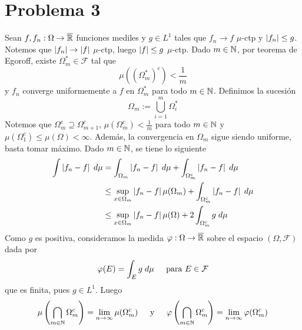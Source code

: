 \documentclass{article}
\begin{document}
\section*{Problema 3}
\noindent Sean $f,f_{n}:\Omega\to\overline{\mathbb{R}}$ funciones mediles y $g\in L^{1}$ tales que $f_{n}\to f$ 
$\mu$-ctp y $\left|f_{n} \right|\leq g$. Notemos que $\left|f_{n} \right|\to\left|f \right|$ $\mu$-ctp, luego 
$\left|f \right|\leq g$ $\mu$-ctp. Dado $m\in\mathbb{N}$, por teorema de Egoroff, existe $\Omega_{m}^{*}\in
\mathcal{F}$ tal que
\begin{equation*}
    \mu((\Omega_{m}^{*})^{c})<\frac{1}{m}
\end{equation*}
y $f_{n}$ converge uniformemente a $f$ en $\Omega_{m}^{*}$ para todo $m\in\mathbb{N}$. 
Definimos la sucesión
\begin{equation*}
    \Omega_{m}:=\bigcup_{i=1}^{m}\Omega_{i}^{*}
\end{equation*}
Notemos que $\Omega_{m}^{c}\supseteq\Omega_{m+1}^{c}$, $\mu(\Omega_{m}^{c})<\frac{1}{m}$ para todo 
$m\in\mathbb{N}$ y $\mu(\Omega_{1}^{c})\leq\mu(\Omega)<\infty$. Además, la convergencia en $\Omega_{m}$ 
sigue siendo uniforme, basta tomar máximo. Dado $m\in\mathbb{N}$, se tiene lo siguiente
\begin{align*}
    \int\left|f_{n}-f \right|\hspace{1mm}d\mu &= \int_{\Omega_{m}}\left|f_{n}-f \right|\hspace{1mm}d\mu+
    \int_{\Omega_{m}^{c}}\left|f_{n}-f \right|\hspace{1mm}d\mu \\
    &\leq \sup_{x\in\Omega_{m}}\left|f_{n}-f \right|\mu(\Omega_{m})
    +\int_{\Omega_{m}^{c}}\left|f_{n}-f \right|\hspace{1mm}d\mu \\
    &\leq \sup_{x\in\Omega_{m}}\left|f_{n}-f \right|\mu(\Omega)
    +2\int_{\Omega_{m}^{c}}g\hspace{1mm}d\mu
\end{align*}
Como $g$ es positiva, consideramos la medida $\varphi:\Omega\to\overline{\mathbb{R}}$ sobre el espacio 
$(\Omega, \mathcal{F})$ dada por
\begin{equation*}
    \varphi(E)=\int_{E}g\hspace{1mm}d\mu\hspace{4mm}\text{ para }E\in\mathcal{F}
\end{equation*}
que es finita, pues $g\in L^{1}$. Luego
\begin{equation*}
    \mu\left(\bigcap_{m\in\mathbb{N}}\Omega_{m}^{c}\right)=\lim\limits_{n\to\infty}\mu(\Omega_{m}^{c})
    \hspace{4mm}\text{ y }\hspace{4mm}
    \varphi\left(\bigcap_{m\in\mathbb{N}}\Omega_{m}^{c}\right)=\lim\limits_{n\to\infty}
    \varphi(\Omega_{m}^{c})
\end{equation*}
\end{document}
